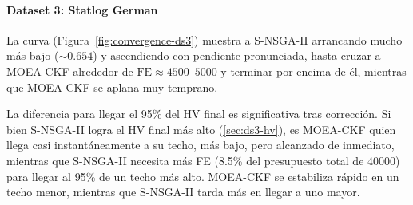 
\paragraph{Dataset 3: Statlog German}\label{sec:ds3-convergencia}

La curva (Figura~\ref{fig:convergence-ds3}) muestra a S-NSGA-II arrancando mucho más bajo ($\sim0.654$) y ascendiendo con pendiente pronunciada, hasta cruzar a MOEA-CKF alrededor de $\text{FE}\approx4500$--$5000$ y terminar por encima de él, mientras que MOEA-CKF se aplana muy temprano.

La diferencia para llegar el 95\% del HV final es significativa tras corrección. Si bien S-NSGA-II logra el HV final más alto (\ref{sec:ds3-hv}), es MOEA-CKF quien llega casi instantáneamente a su techo, más bajo, pero alcanzado de inmediato, mientras que S-NSGA-II necesita más FE (8.5\% del presupuesto total de 40000) para llegar al 95\% de un techo más alto. MOEA-CKF se estabiliza rápido en un techo menor, mientras que S-NSGA-II tarda más en llegar a uno mayor.


